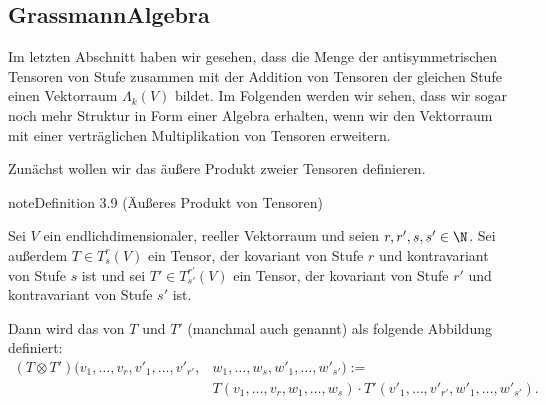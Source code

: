 \documentclass[letterpaper,10pt,english]{jupyterBook}
\begin{document}
\subsection{Grassmann\sphinxhyphen{}Algebra}
\label{\detokenize{vektoranalysis/tensor:grassmann-algebra}}
\sphinxAtStartPar
Im letzten Abschnitt haben wir gesehen, dass die Menge der antisymmetrischen Tensoren von Stufe zusammen mit der Addition von Tensoren der gleichen Stufe einen Vektorraum \(\Lambda_k(V)\) bildet.
Im Folgenden werden wir sehen, dass wir sogar noch mehr Struktur in Form einer Algebra erhalten, wenn wir den Vektorraum mit einer verträglichen Multiplikation von Tensoren erweitern.

\sphinxAtStartPar
Zunächst wollen wir das äußere Produkt zweier Tensoren definieren.
\label{vektoranalysis/tensor:def:aeusseresProduktTensoren}
\begin{sphinxadmonition}{note}{Definition 3.9 (Äußeres Produkt von Tensoren)}



\sphinxAtStartPar
Sei \(V\) ein endlich\sphinxhyphen{}dimensionaler, reeller Vektorraum und seien \(r,r',s,s' \in \N\).
Sei außerdem \(T \in T^r_s(V)\) ein Tensor, der kovariant von Stufe \(r\) und kontravariant von Stufe \(s\) ist und sei \(T' \in T^{r'}_{s'}(V)\) ein Tensor, der kovariant von Stufe \(r'\) und kontravariant von Stufe \(s'\) ist.

\sphinxAtStartPar
Dann wird das  von \(T\) und \(T'\) (manchmal auch  genannt) als folgende Abbildung definiert:
\begin{equation*}
\begin{split}(T \otimes T')(v_1,\ldots,v_r,v'_1,\ldots,v'_{r'},&w_1,\ldots,w_s,w'_1,\ldots,w'_{s'}) := \\
&T(v_1,\ldots,v_r,w_1,\ldots,w_s)\cdot T'(v'_1,\ldots,v'_{r'},w'_1,\ldots,w'_{s'}).\end{split}
\end{equation*}\end{sphinxadmonition}
\end{document}
